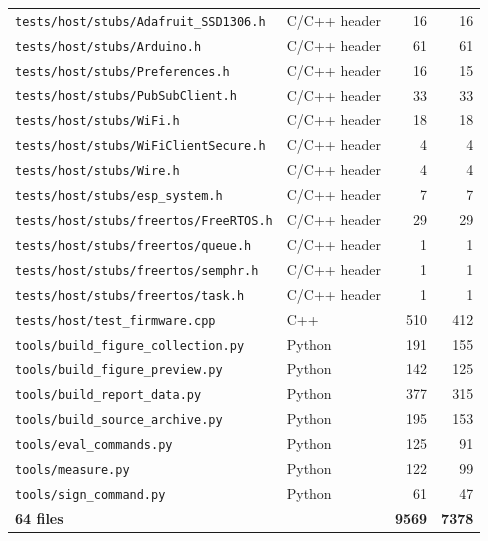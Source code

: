 \begin{longtable}{p{} l r r}
\texttt{\footnotesize tests/host/stubs/Adafruit\_SSD1306.h} & C/C++ header & 16 & 16 \\
\texttt{\footnotesize tests/host/stubs/Arduino.h} & C/C++ header & 61 & 61 \\
\texttt{\footnotesize tests/host/stubs/Preferences.h} & C/C++ header & 16 & 15 \\
\texttt{\footnotesize tests/host/stubs/PubSubClient.h} & C/C++ header & 33 & 33 \\
\texttt{\footnotesize tests/host/stubs/WiFi.h} & C/C++ header & 18 & 18 \\
\texttt{\footnotesize tests/host/stubs/WiFiClientSecure.h} & C/C++ header & 4 & 4 \\
\texttt{\footnotesize tests/host/stubs/Wire.h} & C/C++ header & 4 & 4 \\
\texttt{\footnotesize tests/host/stubs/esp\_system.h} & C/C++ header & 7 & 7 \\
\texttt{\footnotesize tests/host/stubs/freertos/FreeRTOS.h} & C/C++ header & 29 & 29 \\
\texttt{\footnotesize tests/host/stubs/freertos/queue.h} & C/C++ header & 1 & 1 \\
\texttt{\footnotesize tests/host/stubs/freertos/semphr.h} & C/C++ header & 1 & 1 \\
\texttt{\footnotesize tests/host/stubs/freertos/task.h} & C/C++ header & 1 & 1 \\
\texttt{\footnotesize tests/host/test\_firmware.cpp} & C++ & 510 & 412 \\
\texttt{\footnotesize tools/build\_figure\_collection.py} & Python & 191 & 155 \\
\texttt{\footnotesize tools/build\_figure\_preview.py} & Python & 142 & 125 \\
\texttt{\footnotesize tools/build\_report\_data.py} & Python & 377 & 315 \\
\texttt{\footnotesize tools/build\_source\_archive.py} & Python & 195 & 153 \\
\texttt{\footnotesize tools/eval\_commands.py} & Python & 125 & 91 \\
\texttt{\footnotesize tools/measure.py} & Python & 122 & 99 \\
\texttt{\footnotesize tools/sign\_command.py} & Python & 61 & 47 \\
\midrule
\textbf{64 files} & & \textbf{9569} & \textbf{7378} \\
\bottomrule
\end{longtable}
